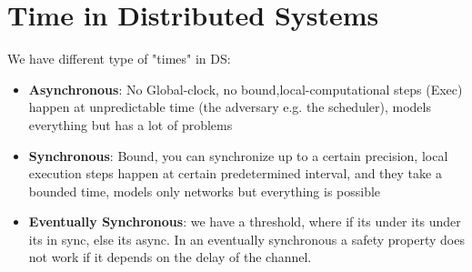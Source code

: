 \documentclass[11pt, a4paper]{article}
\begin{document}
\section{Time in Distributed Systems}
We have different type of "times" in DS:
\begin{itemize}
    \item \textbf{Asynchronous}: No Global-clock, no bound,local-computational steps (Exec) happen at unpredictable time (the adversary e.g. the scheduler), models everything but has a lot of problems
    \item \textbf{Synchronous}: Bound, you can synchronize up to a certain precision, local execution steps happen at certain predetermined interval, and they take a bounded time, models only networks but everything is possible
    \item \textbf{Eventually Synchronous}: we have a threshold, where if its under its under its in sync, else its async. In an eventually synchronous a safety property does not work  if it depends on the delay of the channel.
\end{itemize}
\end{document}

